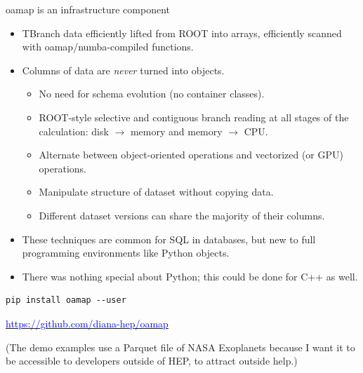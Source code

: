 \documentclass[aspectratio=169]{beamer}
\begin{document}
\begin{frame}{oamap is an infrastructure component}
\vspace{0.5 cm}
\begin{itemize}\setlength{\itemsep}{0.25 cm}
\item TBranch data efficiently lifted from ROOT into arrays, efficiently scanned with oamap/numba-compiled functions.
\item Columns of data are {\it never} turned into objects.
\begin{itemize}
\item No need for schema evolution (no container classes).
\item ROOT-style selective and contiguous branch reading at all stages of the calculation: disk $\to$ memory and memory $\to$ CPU.
\item Alternate between object-oriented operations and vectorized (or GPU) operations.
\item Manipulate structure of dataset without copying data.
\item Different dataset versions can share the majority of their columns.
\end{itemize}
\item These techniques are common for SQL in databases, but new to full programming environments like Python objects.
\item There was nothing special about Python; this could be done for C++ as well.
\end{itemize}
\end{frame}

\begin{frame}[fragile]{}
\vspace{1 cm}
\huge
\begin{center}
\begin{minipage}{0.8\linewidth}
\begin{verbatim}pip install oamap --user
\end{verbatim}
\end{minipage}

\Large
\vspace{1 cm}
\href{https://github.com/diana-hep/oamap}{\textcolor{blue}{https://github.com/diana-hep/oamap}}
\end{center}

\normalsize
\vspace{1 cm}
(The demo examples use a Parquet file of NASA Exoplanets because I want it to be accessible to developers outside of HEP, to attract outside help.)
\end{frame}
\end{document}
